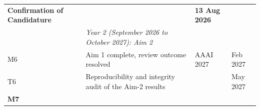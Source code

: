 \documentclass[
  11pt,
]{article}
\begin{document}
\begin{longtable}[]{@{}llll@{}}
\begin{minipage}[t]{0.49\columnwidth}
\textbf{Confirmation of Candidature}\strut
\end{minipage} & \begin{minipage}[t]{0.19\columnwidth}\raggedright
\strut
\end{minipage} & \begin{minipage}[t]{0.15\columnwidth}\raggedright
\textbf{13 Aug 2026}\strut
\end{minipage}\tabularnewline
\begin{minipage}[t]{0.06\columnwidth}\raggedright
\strut
\end{minipage} & \begin{minipage}[t]{0.49\columnwidth}\raggedright
\emph{Year 2 (September 2026 to October 2027): Aim 2}\strut
\end{minipage} & \begin{minipage}[t]{0.19\columnwidth}\raggedright
\strut
\end{minipage} & \begin{minipage}[t]{0.15\columnwidth}\raggedright
\strut
\end{minipage}\tabularnewline
\begin{minipage}[t]{0.06\columnwidth}\raggedright
M6\strut
\end{minipage} & \begin{minipage}[t]{0.49\columnwidth}\raggedright
Aim 1 complete, review outcome resolved\strut
\end{minipage} & \begin{minipage}[t]{0.19\columnwidth}\raggedright
AAAI 2027\strut
\end{minipage} & \begin{minipage}[t]{0.15\columnwidth}\raggedright
Feb 2027\strut
\end{minipage}\tabularnewline
\begin{minipage}[t]{0.06\columnwidth}\raggedright
T6\strut
\end{minipage} & \begin{minipage}[t]{0.49\columnwidth}\raggedright
Reproducibility and integrity audit of the Aim-2 results\strut
\end{minipage} & \begin{minipage}[t]{0.19\columnwidth}\raggedright
\strut
\end{minipage} & \begin{minipage}[t]{0.15\columnwidth}\raggedright
May 2027\strut
\end{minipage}\tabularnewline
\begin{minipage}[t]{0.06\columnwidth}\raggedright
\textbf{M7}\strut

\end{minipage}
\end{longtable}
\end{document}
